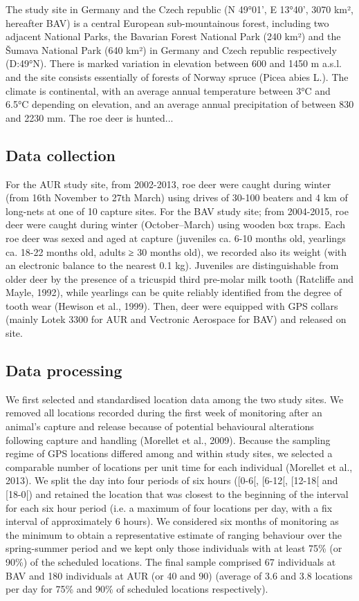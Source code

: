 \documentclass[a4paper,11pt]{article}
\begin{document}
The study site in Germany and the Czech republic (N 49°01', E 13°40',
3070 km², hereafter BAV) is a central European sub-mountainous forest,
including two adjacent National Parks, the Bavarian Forest National
Park (240 km²) and the Šumava National Park (640 km²) in Germany and
Czech republic respectively (D:49°N). There is marked variation in
elevation between 600 and 1450 m a.s.l. and the site consists
essentially of forests of Norway spruce (Picea abies L.). The climate
is continental, with an average annual temperature between 3°C and
6.5°C depending on elevation, and an average annual precipitation of
between 830 and 2230 mm. The roe deer is hunted...

\subsection{Data collection}
For the AUR study site, from 2002-2013, roe deer were caught during
winter (from 16th November to 27th March) using drives of 30-100
beaters and 4 km of long-nets at one of 10 capture sites. For the BAV
study site; from 2004-2015, roe deer were caught during winter
(October–March) using wooden box traps. Each roe deer was sexed and
aged at capture (juveniles ca. 6-10 months old, yearlings ca. 18-22
months old, adults ≥ 30 months old), we recorded also its weight (with
an electronic balance to the nearest 0.1 kg). Juveniles are
distinguishable from older deer by the presence of a tricuspid third
pre-molar milk tooth (Ratcliffe and Mayle, 1992), while yearlings can
be quite reliably identified from the degree of tooth wear (Hewison et
al., 1999). Then, deer were equipped with GPS collars (mainly Lotek
3300 for AUR and Vectronic Aerospace for BAV) and released on site.

\subsection{Data processing}
We first selected and standardised location data among the two study
sites. We removed all locations recorded during the first week of
monitoring after an animal’s capture and release because of potential
behavioural alterations following capture and handling (Morellet et
al., 2009). Because the sampling regime of GPS locations differed
among and within study sites, we selected a comparable number of
locations per unit time for each individual (Morellet et al.,
2013). We split the day into four periods of six hours ([0-6[, [6-12[,
[12-18[ and [18-0[) and retained the location that was closest to the
beginning of the interval for each six hour period (i.e. a maximum of
four locations per day, with a fix interval of approximately 6
hours). We considered six months of monitoring as the minimum to
obtain a representative estimate of ranging behaviour over the
spring-summer period and we kept only those individuals with at least
75\% (or 90\%) of the scheduled locations. The final sample comprised
67 individuals at BAV and 180 individuals at AUR (or 40 and 90)
(average of 3.6 and 3.8 locations per day for 75\% and 90\% of
scheduled locations respectively).
\end{document}
